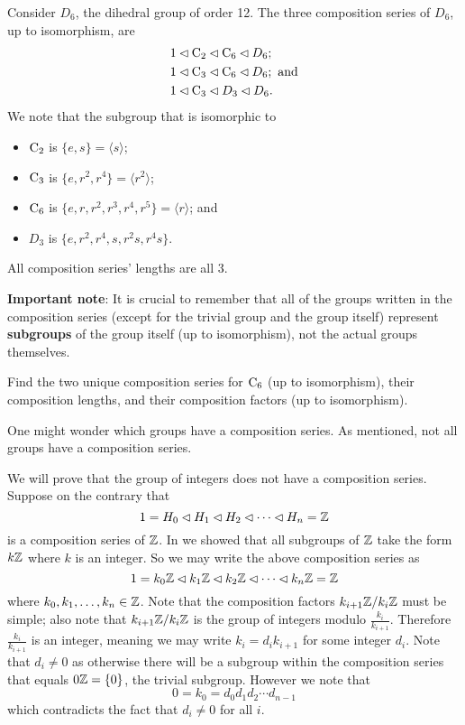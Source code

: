\begin{example}
    Consider $D_6$, the dihedral group of order 12. The three composition series of $D_6$, up to isomorphism, are
    \begin{align*}
        &1 \lhd \mathrm{C}_{2} \lhd \mathrm{C}_{6} \lhd D_6;\\
        &1 \lhd \mathrm{C}_{3} \lhd \mathrm{C}_{6} \lhd D_6; \text{ and}\\
        &1 \lhd \mathrm{C}_{3} \lhd D_3 \lhd D_6.
    \end{align*}
    We note that the subgroup that is isomorphic to
    \begin{itemize}
        \item $\mathrm{C}_{2}$ is $\{e, s\} = \langle s \rangle$;
        \item $\mathrm{C}_{3}$ is $\{e, r^2, r^4\} = \langle r^2\rangle$;
        \item $\mathrm{C}_{6}$ is $\{e, r, r^2, r^3, r^4, r^5\} = \langle r\rangle$; and
        \item $D_3$ is $\{e, r^2, r^4, s, r^2s, r^4s\}$.
    \end{itemize}
    All composition series' lengths are all 3.
\end{example}

\textbf{Important note}: It is crucial to remember that all of the groups written in the composition series (except for the trivial group and the group itself) represent \textbf{subgroups} of the group itself (up to isomorphism), not the actual groups themselves.

\begin{exercise}
    Find the two unique composition series for $\mathrm{C}_{6}$ (up to isomorphism), their composition lengths, and their composition factors (up to isomorphism).
\end{exercise}

One might wonder which groups have a composition series. As mentioned, not all groups have a composition series.

\begin{example}
    We will prove that the group of integers does not have a composition series. Suppose on the contrary that
    \[
        1 = H_0 \lhd H_1 \lhd H_2 \lhd \cdots \lhd H_n = \mathbb{Z}
    \]
    is a composition series of $\mathbb{Z}$. In  we showed that all subgroups of $\mathbb{Z}$ take the form $k\mathbb{Z}$ where $k$ is an integer. So we may write the above composition series as
    \[
        1 = k_0\mathbb{Z} \lhd k_1\mathbb{Z} \lhd k_2\mathbb{Z} \lhd \cdots \lhd k_n\mathbb{Z} = \mathbb{Z}
    \]
    where $k_0, k_1, \dots, k_n \in \mathbb{Z}$. Note that the composition factors $k_{i+1}\mathbb{Z}/k_i\mathbb{Z}$ must be simple; also note that $k_{i+1}\mathbb{Z}/k_i\mathbb{Z}$ is the group of integers modulo $\frac{k_i}{k_{i+1}}$. Therefore $\frac{k_i}{k_{i+1}}$ is an integer, meaning we may write $k_i = d_ik_{i+1}$ for some integer $d_i$. Note that $d_i \neq 0$ as otherwise there will be a subgroup within the composition series that equals $0\mathbb{Z} = \{0\}$, the trivial subgroup. However we note that
    \[
        0 = k_0 = d_0d_1d_2\cdots d_{n-1}
    \]
    which contradicts the fact that $d_i \neq 0$ for all $i$.
\end{example}

